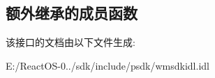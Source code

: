 \subsection*{额外继承的成员函数}


该接口的文档由以下文件生成\+:\begin{DoxyCompactItemize}
\item 
E\+:/\+React\+O\+S-\/0../sdk/include/psdk/wmsdkidl.\+idl\end{DoxyCompactItemize}

